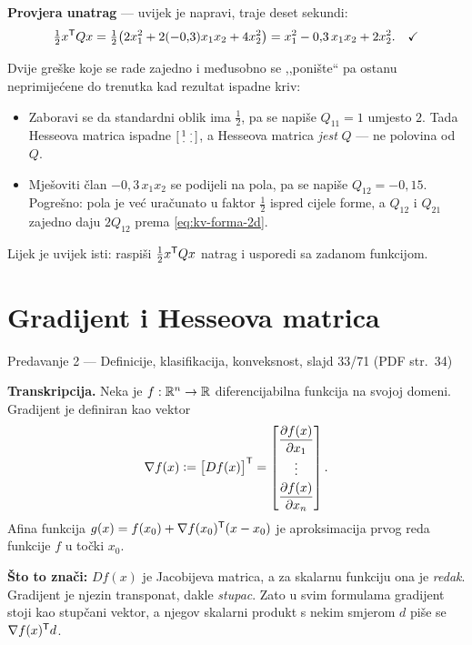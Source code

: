 \textbf{Provjera unatrag} --- uvijek je napravi, traje deset sekundi:
\begin{equation}
\tfrac{1}{2}x^{\mathsf{T}} Q x = \tfrac{1}{2}\bigl(2x_1^2 + 2(-0{,}3)x_1x_2 + 4x_2^2\bigr)
= x_1^2 - 0{,}3\,x_1x_2 + 2x_2^2 . \quad\checkmark
\end{equation}

\begin{zamka}
Dvije greške koje se rade zajedno i međusobno se ,,ponište`` pa ostanu
neprimijećene do trenutka kad rezultat ispadne kriv:
\begin{itemize}[nosep,leftmargin=*]
  \item Zaboravi se da standardni oblik ima $\tfrac{1}{2}$, pa se napiše
        $Q_{11} = 1$ umjesto $2$. Tada Hesseova matrica ispadne
        $\begin{bsmallmatrix} 1 & \cdot \\ \cdot & \cdot \end{bsmallmatrix}$,
        a Hesseova matrica \emph{jest} $Q$ --- ne polovina od $Q$.
  \item Mješoviti član $-0{,}3\,x_1x_2$ se podijeli na pola, pa se napiše
        $Q_{12} = -0{,}15$. Pogrešno: pola je već uračunato u faktor
        $\tfrac{1}{2}$ ispred cijele forme, a $Q_{12}$ i $Q_{21}$ zajedno daju
        $2Q_{12}$ prema \eqref{eq:kv-forma-2d}.
\end{itemize}
Lijek je uvijek isti: raspiši $\tfrac{1}{2}x^{\mathsf{T}} Q x$ natrag i usporedi sa
zadanom funkcijom.
\end{zamka}

\section{Gradijent i Hesseova matrica}
\label{sec:gradijent-hessian}

\begin{izvor}{Predavanje 2 --- Definicije, klasifikacija, konveksnost, slajd 33/71 (PDF str.~34)}

\textbf{Transkripcija.} Neka je $f: \mathbb{R}^n \to \mathbb{R}$ diferencijabilna funkcija na
svojoj domeni. Gradijent je definiran kao vektor
\[
\nabla f(x) \mathrel{\vcentcolon=} \bigl[Df(x)\bigr]^{\mathsf{T}} =
\begin{bmatrix} \dfrac{\partial f(x)}{\partial x_1} \\[6pt] \vdots \\[2pt]
                \dfrac{\partial f(x)}{\partial x_n} \end{bmatrix}.
\]
Afina funkcija $g(x) = f(x_0) + \nabla f(x_0)^{\mathsf{T}} (x - x_0)$ je aproksimacija
prvog reda funkcije $f$ u točki $x_0$.

\textbf{Što to znači:} $Df(x)$ je Jacobijeva matrica, a za skalarnu funkciju ona
je \emph{redak}. Gradijent je njezin transponat, dakle \emph{stupac}. Zato u
svim formulama gradijent stoji kao stupčani vektor, a njegov skalarni produkt s
nekim smjerom $d$ piše se $\nabla f(x)^{\mathsf{T}} d$.
\end{izvor}

